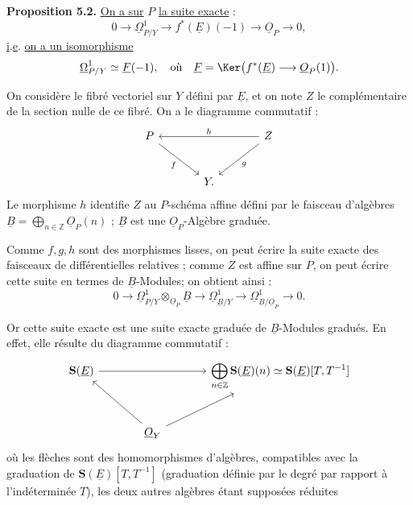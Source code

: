 
\textbf{Proposition 5.2.} \uline{On a sur} \(P\) \uline{la suite exacte} :
\[
0\longrightarrow\underline{\Omega}^1_{P/Y}\longrightarrow f^*(\underline{E})(-1)\longrightarrow\underline{O}_P\longrightarrow0,
\]
\uline{i}.\uline{e}. \uline{on a un isomorphisme}
\[
\underline{\Omega}^1_{P/Y}\simeq \underline{F}(-1),\quad\text{où}\quad \underline{F}=\Ker\bigl(f^*(\underline{E})\longrightarrow\underline{O}_P(1)\bigr).
\]

On considère le fibré vectoriel sur \(Y\) défini par \(\underline{E}\), et on note \(Z\) le complémentaire de la section nulle de ce fibré. On a le diagramme commutatif :
\[
\begin{tikzcd}[column sep=large,row sep=large]
P \arrow[dr,"f"'] && Z \arrow[ll,"h"'] \arrow[dl,"g"]\\
& Y. &
\end{tikzcd}
\]
Le morphisme \(h\) identifie \(Z\) au \(P\)-schéma affine défini par le faisceau d'algèbres \(\underline{B}=\bigoplus_{n\in\mathbb Z}\underline{O}_P(n)\) ; \(\underline{B}\) est une \(\underline{O}_P\)-Algèbre graduée.

Comme \(f,g,h\) sont des morphismes lisses, on peut écrire la suite exacte des faisceaux de différentielles relatives ; comme \(Z\) est affine sur \(P\), on peut écrire cette suite en termes de \(\underline{B}\)-Modules; on obtient ainsi :
\begin{equation}\tag{5.2.1}
0\longrightarrow
 \underline{\Omega}^1_{P/Y}\otimes_{\underline{O}_P}\underline{B}
\longrightarrow
 \underline{\Omega}^1_{\underline{B}/Y}
\longrightarrow
 \underline{\Omega}^1_{\underline{B}/\underline{O}_P}
\longrightarrow0 .
\end{equation}

Or cette suite exacte est une suite exacte graduée de \(\underline{B}\)-Modules gradués. En effet, elle résulte du diagramme commutatif :
\[
\begin{tikzcd}[column sep=large,row sep=large]
\mathbf{S}(\underline{E}) \arrow[rr] && \displaystyle\bigoplus_{n\in\mathbb Z}\mathbf{S}(\underline{E})(n)\simeq \mathbf{S}(\underline{E})[T,T^{-1}]\\
& \underline{O}_Y \arrow[ul] \arrow[ur] &
\end{tikzcd}
\]
où les flèches sont des homomorphismes d'algèbres, compatibles avec la graduation de \(\mathbf{S}(\underline{E})[T,T^{-1}]\) (graduation définie par le degré par rapport à l'indéterminée \(T\)), les deux autres algèbres étant supposées réduites
